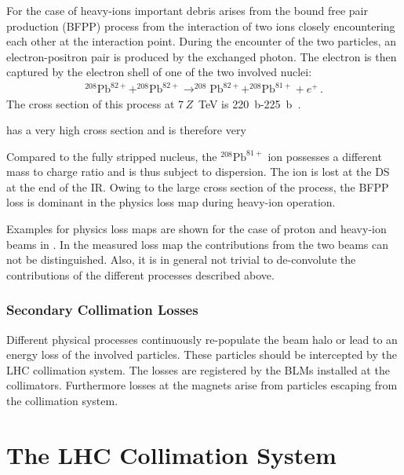 For the case of heavy-ions important debris arises from the bound free pair production (BFPP) process from the interaction of two \lead ions closely encountering each other at the interaction point. During the encounter of the two particles, an electron-positron pair is produced by the exchanged photon. The electron is then captured by the electron shell of one of the two involved nuclei:
\begin{align}
^{208}\text{Pb}^{82+} + ^{208}\text{Pb}^{82+} \rightarrow ^{208}\text{Pb}^{82+} + ^{208}\text{Pb}^{81+} + e^+ \, .
\end{align}
The cross section of this process at 7$\,Z$~TeV is 220~b-225~b~\cite{BFPP1}.

 has a very high cross section and is therefore very 


Compared to the fully stripped nucleus, the $^{208}\text{Pb}^{81+}$ ion possesses a different mass to charge ratio and is thus subject to dispersion. The ion is lost at the DS at the end of the IR. Owing to the large cross section of the process, the BFPP loss is dominant in the physics loss map during heavy-ion operation.

Examples for physics loss maps are shown for the case of proton and heavy-ion beams in . In the measured loss map the contributions from the two beams can not be distinguished. Also, it is in general not trivial to de-convolute the contributions of the different processes described above. 
%
\subsubsection{Secondary Collimation Losses} 

Different physical processes continuously re-populate the beam halo or lead to an energy loss of the involved particles. These particles should be intercepted by the LHC collimation system. The losses are registered by the BLMs installed at the collimators. Furthermore losses at the magnets arise from particles escaping from the collimation system. 

%

%
\section{The LHC Collimation System}

